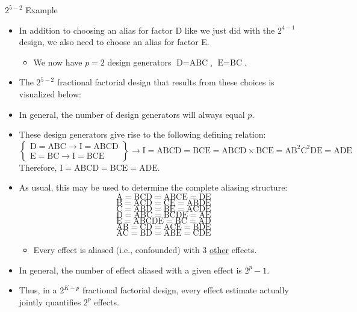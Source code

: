 \begin{Example}{$ 2^{5-2} $ Example}{}
    \begin{itemize}
        \item In addition to choosing an alias for factor D like we just did with the $ 2^{4-1} $ design, we also need to choose an alias for factor E.
              \begin{itemize}[label={}]
                  \item We now have $ p=2 $ design generators $ \text{D}=\text{ABC} $, $ \text{E}=\text{BC} $.
              \end{itemize}
    \end{itemize}
    \begin{itemize}[*]
        \item The $ 2^{5-2} $ fractional factorial design that results from these choices is visualized below:
        \item In general, the number of design generators will always equal $ p $.
    \end{itemize}
    \begin{itemize}
        \item These design generators give rise to the following defining relation:
              \[ \begin{Bmatrix}
                      \text{D}=\text{ABC}\rightarrow \text{I}=\text{ABCD} \\
                      \text{E}=\text{BC}\rightarrow \text{I}=\text{BCE}
                  \end{Bmatrix}\rightarrow
                  \text{I}=\text{ABCD}=\text{BCE}=\text{ABCD}\times\text{BCE}=\text{A}\text{B}^2\text{C}^2\text{DE}=\text{ADE} \]
              Therefore, $ \text{I}=\text{ABCD}=\text{BCE}=\text{ADE} $.
        \item As usual, this may be used to determine the complete aliasing structure:
              \[ \text{A}=\text{BCD}=\text{ABCE}=\text{DE} \]
              \[ \text{B}=\text{ACD}=\text{CE}=\text{ABDE} \]
              \[ \text{C}=\text{ABD}=\text{BE}=\text{ACDE} \]
              \[ \text{D}=\text{ABC}=\text{BCDE}=\text{AE} \]
              \[ \text{E}=\text{ABCDE}=\text{BC}=\text{AD} \]
              \[ \text{AB}=\text{CD}=\text{ACE}=\text{BDE} \]
              \[ \text{AC}=\text{BD}=\text{ABE}=\text{CDE} \]
              \begin{itemize}[*]
                  \item Every effect is aliased (i.e., confounded) with 3 \underline{other} effects.
              \end{itemize}
    \end{itemize}
    \begin{itemize}[*]
        \item In general, the number of effect aliased with a given effect is $ 2^{p}-1 $.
        \item Thus, in a $ 2^{K-p} $ fractional factorial design, every effect estimate actually jointly quantifies $2^p$ effects.
    \end{itemize}
\end{Example}
